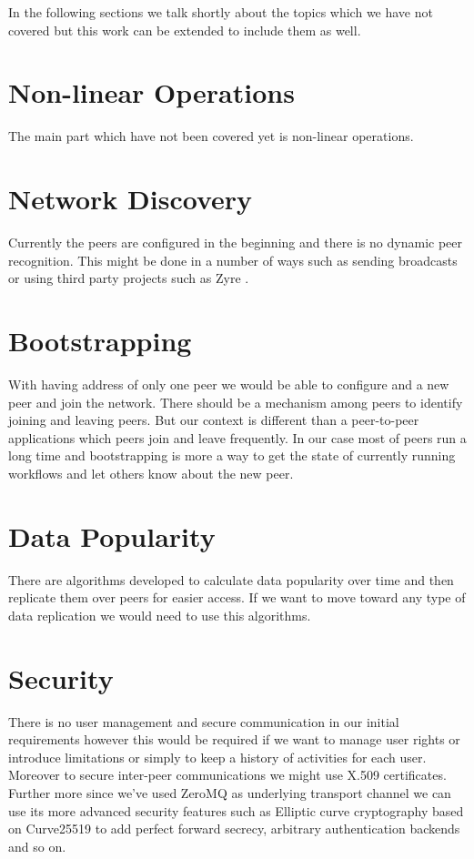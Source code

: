 In the following sections we talk shortly about the topics which we have
not covered but this work can be extended to include them as well.

\section{Non-linear Operations}
The main part which have not been covered yet is non-linear operations.


\section{Network Discovery}
Currently the peers are configured in the beginning and there is no dynamic peer recognition. This might be done in a number of ways
such as sending broadcasts or using third party projects such as Zyre \cite{Zyre}.

\section{Bootstrapping}
With having address of only one peer we would be able to configure and a new peer and join the network. There should be a mechanism among
peers to identify joining and leaving peers. But our context is different than a peer-to-peer applications which peers join and leave 
frequently. In our case most of peers run a long time and bootstrapping is more a way to get the state of currently running workflows and
let others know about the new peer.

\section{Data Popularity}
There are algorithms developed to calculate data popularity over time and then replicate them over peers for easier access. If we want to 
move toward any type of data replication we would need to use this algorithms.

\section{Security}
There is no user management and secure communication in our initial requirements however this would be required if we want to manage user
rights or introduce limitations or simply to keep a history of activities for each user. Moreover to secure inter-peer communications 
we might use X.509 certificates. Further more since we've used ZeroMQ\cite{ZeroMQ} as underlying transport channel we can use its more advanced
security features such as Elliptic curve cryptography\cite{Curve} based on Curve25519\cite{Curve25519} to add perfect forward secrecy, 
arbitrary authentication backends and so on.

